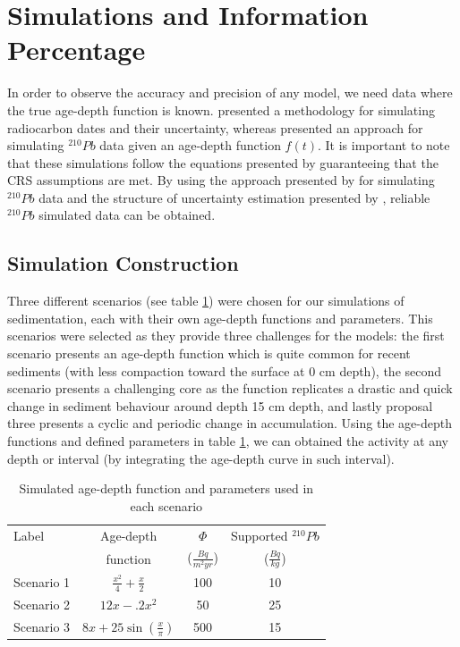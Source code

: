 \documentclass [10pt] {article}
\begin{document}
\section{Simulations and Information Percentage}
	In order to observe the accuracy and precision of any model, we need data where the true age-depth function is known.
\citet{Blaauw2018} presented a methodology for simulating radiocarbon dates and their uncertainty, whereas \citet{Aquino2018} presented an approach for simulating $^{210}Pb$ data given an age-depth function $f(t)$.
It is important to note that these simulations follow the equations presented by \citet*{Appleby1978,Robbins1978} guaranteeing that the CRS assumptions are met. 
By using the approach presented by \citet{Aquino2018} for simulating $^{210}Pb$ data and the structure of uncertainty estimation presented by \citet{Blaauw2018}, reliable $^{210}Pb$ simulated data can be obtained.

\subsection{Simulation Construction}\label{sec:SimConst}

Three different scenarios (see table \ref{tab:sim_param}) were chosen for our simulations of sedimentation, each with their own age-depth functions and parameters. 
This scenarios were selected as they provide three challenges for the models: the first scenario presents an age-depth function which is quite common for recent sediments (with less compaction toward the surface at 0 cm depth), the second scenario presents a challenging core as the function replicates a drastic and quick change in sediment behaviour around depth 15 cm depth, and lastly proposal three presents a cyclic and periodic change in accumulation. 
Using the age-depth functions and defined parameters in table \ref{tab:sim_param}, we can obtained the activity at any depth or interval (by integrating the age-depth curve in such interval).

\begin{table}[!h]
	\centering
	\begin{tabular}{l|ccc}
Label    	& 	Age-depth		&	$ \Phi$		& Supported $^{210}Pb$  \\
		&	function		&	($\frac{Bq}{m^2yr }$)	& ($\frac{Bq}{kg}$) 	\\ \hline
Scenario 1 	&	$\frac{x^2}{4} + \frac{x}{2}$	&	100	& 10	\\
Scenario 2 	&	$12x -.2x^2$			&	50	& 25	\\
Scenario 3 	&	$8x+25\sin(\frac{x}{\pi})$	&	500 	& 15		
	\end{tabular}
	\label{tab:sim_param}
	\caption{Simulated age-depth function and parameters used in each scenario}
 \end{table}
\end{document}

